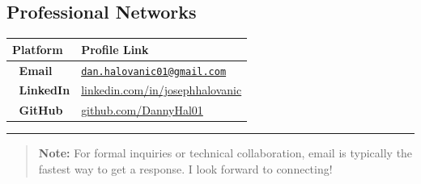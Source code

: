 \documentclass[
]{book}
\newcounter{none} %
\begin{document}
\subsection*{Professional Networks}\label{professional-networks}

{\def\LTcaptype{none} %
\begin{longtable}[]{@{}
  >{\raggedright\arraybackslash}p{}
  >{\raggedright\arraybackslash}p{}@{}}
\toprule\noalign{}
\begin{minipage}[b]{\linewidth}\raggedright
Platform
\end{minipage} & \begin{minipage}[b]{\linewidth}\raggedright
Profile Link
\end{minipage} \\
\midrule\noalign{}
\endhead
\bottomrule\noalign{}
\endlastfoot
📧 \textbf{Email} & \href{mailto:dan.halovanic01@gmail.com}{\nolinkurl{dan.halovanic01@gmail.com}} \\
🔗 \textbf{LinkedIn} & \href{https://linkedin.com/in/josephhalovanic}{linkedin.com/in/josephhalovanic} \\
💼 \textbf{GitHub} & \href{https://github.com/DannyHal01}{github.com/DannyHal01} \\
\end{longtable}
}

\begin{center}\rule{0.5\linewidth}{0.5pt}\end{center}

\begin{quote}
\textbf{Note:} For formal inquiries or technical collaboration, email is typically the fastest way to get a response. I look forward to connecting!
\end{quote}
\end{document}
